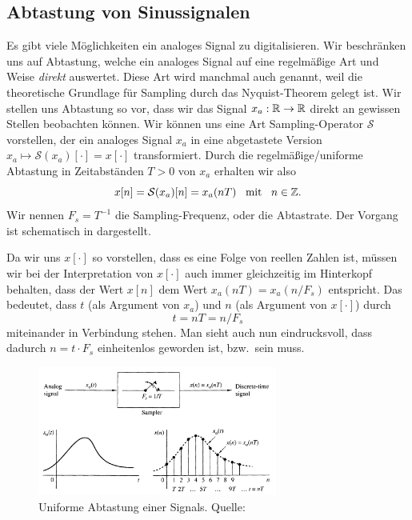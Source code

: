 \subsection{Abtastung von Sinussignalen}\label{sec:sample_harm}
%
Es gibt viele Möglichkeiten ein analoges Signal zu digitalisieren.
Wir beschränken uns auf Abtastung, welche ein analoges Signal auf eine regelmäßige Art und Weise \emph{direkt} auswertet.
Diese Art wird manchmal auch  genannt, weil die theoretische Grundlage für  Sampling durch das Nyquist-Theorem gelegt ist.
Wir stellen uns Abtastung so vor, dass wir das Signal $x_a: \mathbb{R} \rightarrow \mathbb{R}$ direkt an gewissen Stellen beobachten können.
Wir können uns eine Art Sampling-Operator $\mathcal{S}$ vorstellen, der ein analoges Signal $x_a$ in eine abgetastete Version $x_a \mapsto \mathcal{S}(x_a)[\cdot] = x[\cdot]$ transformiert.
Durch die regelmäßige/uniforme Abtastung in Zeitabständen $T > 0$ von $x_a$ erhalten wir also
\[
    x[n] = \mathcal{S}(x_a)[n] = x_a(n T) {\hspace{3mm} \text{mit} \hspace{3mm}} n \in \mathbb{Z}.
\]
Wir nennen $F_s = T^{-1}$ die Sampling-Frequenz, oder die Abtastrate.
Der Vorgang ist schematisch in  dargestellt.

Da wir uns $x[\cdot]$ so vorstellen, dass es  eine Folge von reellen Zahlen ist, müssen wir bei der Interpretation von $x[\cdot]$ auch immer gleichzeitig im Hinterkopf behalten, dass der Wert $x[n]$ dem Wert $x_a(n T) = x_a(n/F_s)$ entspricht.
Das bedeutet, dass $t$ (als Argument von $x_a$) und $n$ (als Argument von $x[\cdot]$) durch
\[
t = n T = n/F_s
\]
miteinander in Verbindung stehen. 
Man sieht auch nun eindrucksvoll, dass dadurch $n = t \cdot F_s$ einheitenlos geworden ist, bzw.~sein muss.
%
\begin{figure}
    \begin{center}
        \includegraphics[width=0.7\textwidth]{img/sampling/uniform_sampling.png}
    \end{center}
    \caption{Uniforme Abtastung einer Signals. Quelle: \cite{proakis2013}}\label{fig:uniform_sampling}
\end{figure}

